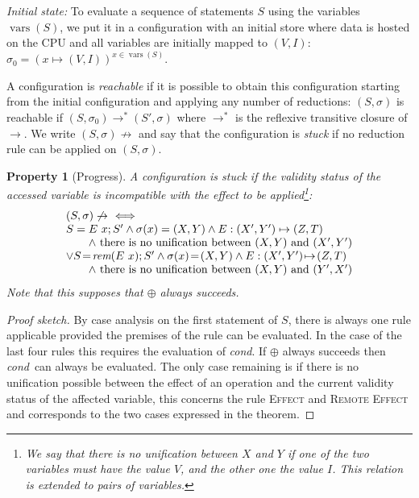 \documentclass[preprint,12pt]{elsarticle}
\newcommand{\symb}[1]{\textit{#1}}
\newcommand{\cond}{\symb{cond}}
\DeclareMathOperator{\vars}{vars}
\newcommand{\rem}[1]{\symb{rem}(#1)}
\newtheorem{Property}{Property}
\begin{document}
\noindent\emph{Initial state:} To evaluate a sequence of statements $S$ using the 
variables 
$\vars(S)$, we put it in a configuration with 
an initial 
store where data is hosted on the CPU and all variables are initially mapped to $(V,I)$: 
$\sigma_0=(x\mapsto 
(V,I))^{x\in \vars(S)}$.



A configuration is \emph{reachable} if it is possible to obtain this configuration 
starting from the initial configuration and applying any number of reductions: 
$(S,\sigma)$ is reachable if $(S,\sigma_0)\to^*(S',\sigma)$ where $\to^*$ is the 
reflexive 
transitive closure of $\to$. We write $(S,\sigma)\not\to $ and say that the configuration 
is \emph{stuck} if no reduction rule can be 
applied on $(S,\sigma)$.
\begin{Property}[Progress]\label{prop:stuck}
 A configuration is stuck if the validity status of the accessed variable is 
incompatible with the effect to be applied\footnote{We say that there is no unification  between $X$ and $Y$ if one of the two variables must have the value $V$, and the other one the value $I$. This relation is extended to pairs of variables.}:
\[\begin{array}{@{}l@{}}
(S,\sigma)\not\to\ \iff\\
 \begin{array}[t]{@{}l@{}}
S=E~x;S' \land \sigma(x)=(X,Y) 
							\land E:  (X',Y')\mapsto (Z,T)\ 
						\\\qquad 	\land~\text{there is no unification  between } 
							(X,Y)   
							\text{ and } (X',Y')\\
\lor S\!=\!\rem{E~x};S' \land \sigma(x)\!=\!(X,Y) 
							\land E:  (X',Y')\!\mapsto\! (Z,T)\ 
							\\\qquad \land~\text{there is no unification  between } 
							(X,Y)   
							\text{ and } (Y',X')		
\end{array}
\end{array}\]
Note that this supposes that $\oplus$ always succeeds.
\end{Property}
\begin{proof}[Proof sketch]
By case analysis on the first statement of $S$, there is always 
one rule applicable provided the premises of the rule can be evaluated.
In the case of the last four rules this requires the evaluation of \cond. If $\oplus$ 
always succeeds then \cond\ can always be 
evaluated. The only case remaining is if there is no unification possible between the 
effect of an operation and the current validity status of the affected variable, this 
concerns the rule \textsc{Effect} and \textsc{Remote Effect} and corresponds to the two 
cases expressed in the theorem.
\end{proof}
\end{document}
